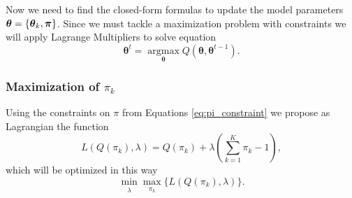 \documentclass[12pt]{article}
\begin{document}
\noindent Now we need to find the closed-form formulas to update the model parameters $\boldsymbol\theta = \{\boldsymbol\theta_k, \boldsymbol\pi\}$. Since we must tackle a maximization problem with constraints we will apply Lagrange Multipliers to solve equation
\begin{equation}
\boldsymbol { \theta } ^ { t } = \underset { \boldsymbol { \theta } } { \operatorname { argmax } } Q \left( \boldsymbol { \theta } , \boldsymbol { \theta } ^ { t - 1 } \right).
\end{equation}

\subsubsection{Maximization of $\pi_k$}

\noindent Using the constraints on $\pi$ from Equations \ref{eq:pi_constraint} we propose as Lagrangian the function
\begin{equation}\label{eq:lagrange_pi,k}
L\left( Q(\pi_{k}),\lambda \right) = Q(\pi_{k}) + \lambda \left( \sum \limits_{k=1}^{K} \pi_{k} - 1 \right),
\end{equation}
which will be optimized in this way
\begin{equation}\label{minmax_lagrange_pi,k}
\min_{\substack{\lambda}}\max_{\substack{\pi_{k}}} \lbrace L\left( Q(\pi_{k}),\lambda \right) \rbrace.
\end{equation}
\end{document}
